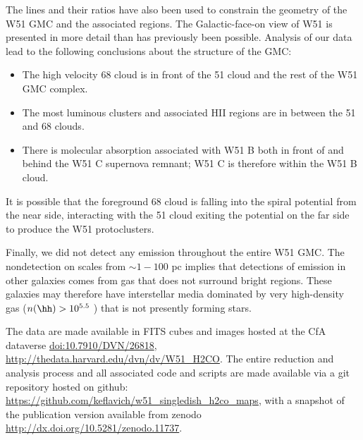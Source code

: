 The \formaldehyde lines and their ratios have also been used to constrain the
geometry of the W51 GMC and the associated \hii regions.  The Galactic-face-on
view of W51 is presented in more detail than has previously been possible.
Analysis of our \formaldehyde data lead to the following conclusions about the
structure of the GMC:
\begin{itemize}
    \item The high velocity 68 \kms cloud is in front of the 51 \kms cloud
        and the rest of the W51 GMC complex.
    \item The most luminous clusters and associated HII regions are in between
        the 51 \kms and 68 \kms clouds.
    \item There is molecular absorption associated with W51 B both in front of
        and behind the W51 C supernova remnant; W51 C is therefore within the
        W51 B cloud.
\end{itemize}
It is possible that the foreground 68 \kms cloud is falling into the spiral
potential from the near side, interacting with the 51 \kms cloud exiting the
potential on the far side to produce the W51 protoclusters.  

Finally, we did not detect any \formaldehyde emission throughout the entire W51
GMC.  The nondetection on scales from $\sim1-100$ pc implies that detections of
\formaldehyde \oneone emission in other galaxies comes from gas that does not
surround bright \hii regions.  These galaxies may therefore have interstellar
media dominated by very high-density gas ($n(\hh)>10^{5.5}$ \percc) that is not
presently forming stars.


The data are made available in FITS cubes and images hosted at the CfA
dataverse \url{doi:10.7910/DVN/26818},
\url{http://thedata.harvard.edu/dvn/dv/W51_H2CO}.
The entire reduction and analysis process and all associated code and scripts
are made available via a git
repository hosted on github:
\url{https://github.com/keflavich/w51_singledish_h2co_maps}, with a
snapshot of the publication version available from zenodo
\url{http://dx.doi.org/10.5281/zenodo.11737}.


